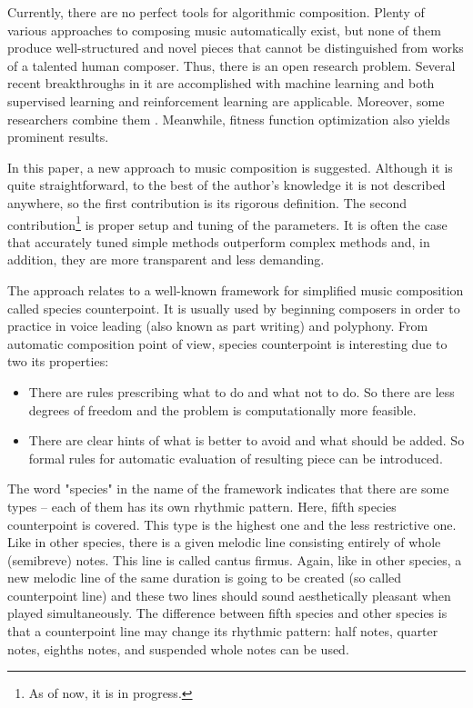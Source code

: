\documentclass{article}
\begin{document}
Currently, there are no perfect tools for algorithmic composition. Plenty of various approaches to composing music automatically exist, but none of them produce well-structured and novel pieces that cannot be distinguished from works of a talented human composer. Thus, there is an open research problem. Several recent breakthroughs in it are accomplished with machine learning and both supervised learning \cite{johnson2017generating, payne2019musenet} and reinforcement learning \cite{yi2007automatic, smith2012reinforcement} are applicable. Moreover, some researchers combine them \cite{jaques2016generating, kotecha2018bach, kumar2019polyphonic}. Meanwhile, fitness function optimization also yields prominent results\cite{herremans2012first, herremans2013fifth}.

In this paper, a new approach to music composition is suggested. Although it is quite straightforward, to the best of the author's knowledge it is not described anywhere, so the first contribution is its rigorous definition. The second contribution\footnote{As of now, it is in progress.} is proper setup and tuning of the parameters. It is often the case that accurately tuned simple methods outperform complex methods \cite{dacrema2019are} and, in addition, they are more transparent and less demanding.

The approach relates to a well-known framework for simplified music composition called species counterpoint. It is usually used by beginning composers in order to practice in voice leading (also known as part writing) and polyphony. From automatic composition point of view, species counterpoint is interesting due to two its properties:
\begin{itemize}
	\item There are rules prescribing what to do and what not to do. So there are less degrees of freedom and the problem is computationally more feasible.
	\item There are clear hints of what is better to avoid and what should be added. So formal rules for automatic evaluation of resulting piece can be introduced.
\end{itemize}

The word "species" in the name of the framework indicates that there are some types -- each of them has its own rhythmic pattern. Here, fifth species counterpoint is covered. This type is the highest one and the less restrictive one. Like in other species, there is a given melodic line consisting entirely of whole (semibreve) notes. This line is called cantus firmus. Again, like in other species, a new melodic line of the same duration is going to be created (so called counterpoint line) and these two lines should sound aesthetically pleasant when played simultaneously. The difference between fifth species and other species is that a counterpoint line may change its rhythmic pattern: half notes, quarter notes, eighths notes, and suspended whole notes can be used. 
\end{document}
